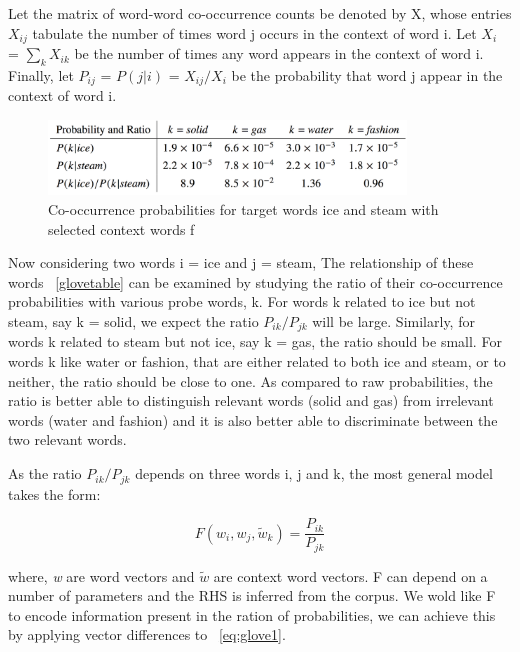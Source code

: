 Let the matrix of word-word co-occurrence counts be denoted by X, whose entries  ${X}_{ij}$ tabulate the number of times word j occurs in the context of word i. Let  ${X}_{i}$ = $\sum_{k} {X}_{ik}$ be the number of times any word appears in the context of word i. Finally, let ${P}_{ij}$ = $P(j | i)$ = ${X}_{ij}/{X}_{i}$ be the probability that word j appear in the context of word i.

\begin{figure}[ht!]
	\centering
		\includegraphics[height=20mm,  width=95mm]{figures/4_glovetable.png}
		\caption[Co-occurrence probabilities for target words]{Co-occurrence probabilities for target words ice and steam with selected context words f}
			\label{glovetable}
\end{figure}

Now considering two words i = ice and j = steam, The relationship of these words ~\autoref{glovetable} can be examined by studying the ratio of their co-occurrence probabilities with various probe words, k. For words k related to ice but not steam, say k = solid, we expect the ratio ${P}_{ik} /{P}_{jk}$ will be large. Similarly, for words k related to steam but not ice, say k = gas, the ratio should be small. For words k like water or fashion, that are either related to both ice and steam, or to neither, the ratio should be close to one. As compared to raw probabilities, the ratio is better able to distinguish relevant words (solid and gas) from irrelevant words (water and fashion) and it is also better able to discriminate between the two relevant words.

As the ratio ${P}_{ik} /{P}_{jk}$ depends on three words i, j and k, the most general model takes the form:

\begin{equation} \label{eq:glove1}
F({w}_{i},{w}_{j},{\tilde{w}}_{k}) = \frac{{P}_{ik}}{{P}_{jk}}
\end{equation}

where, \textit{w} are word vectors and $\tilde{w}$ are context word vectors. F can depend on a number of parameters and the RHS is inferred from the corpus. We wold like F to encode information present in the ration of probabilities, we can achieve this by applying vector differences to ~\autoref{eq:glove1}. 

